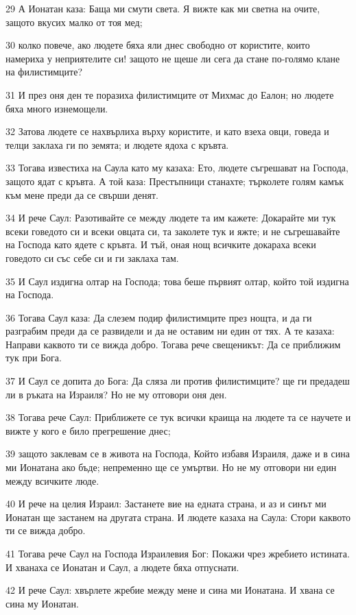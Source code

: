 \par 29 А Ионатан каза: Баща ми смути света. Я вижте как ми светна на очите, защото вкусих малко от тоя мед;
\par 30 колко повече, ако людете бяха яли днес свободно от користите, които намериха у неприятелите си! защото не щеше ли сега да стане по-голямо клане на филистимците?
\par 31 И през оня ден те поразиха филистимците от Михмас до Еалон; но людете бяха много изнемощели.
\par 32 Затова людете се нахвърлиха върху користите, и като взеха овци, говеда и телци заклаха ги по земята; и людете ядоха с кръвта.
\par 33 Тогава известиха на Саула като му казаха: Ето, людете съгрешават на Господа, защото ядат с кръвта. А той каза: Престъпници станахте; търколете голям камък към мене преди да се свърши денят.
\par 34 И рече Саул: Разотивайте се между людете та им кажете: Докарайте ми тук всеки говедото си и всеки овцата си, та заколете тук и яжте; и не съгрешавайте на Господа като ядете с кръвта. И тъй, оная нощ всичките докараха всеки говедото си със себе си и ги заклаха там.
\par 35 И Саул издигна олтар на Господа; това беше първият олтар, който той издигна на Господа.
\par 36 Тогава Саул каза: Да слезем подир филистимците през нощта, и да ги разграбим преди да се развидели и да не оставим ни един от тях. А те казаха: Направи каквото ти се вижда добро. Тогава рече свещеникът: Да се приближим тук при Бога.
\par 37 И Саул се допита до Бога: Да сляза ли против филистимците? ще ги предадеш ли в ръката на Израиля? Но не му отговори оня ден.
\par 38 Тогава рече Саул: Приближете се тук всички краища на людете та се научете и вижте у кого е било прегрешение днес;
\par 39 защото заклевам се в живота на Господа, Който избавя Израиля, даже и в сина ми Ионатана ако бъде; непременно ще се умъртви. Но не му отговори ни един между всичките люде.
\par 40 И рече на целия Израил: Застанете вие на едната страна, и аз и синът ми Ионатан ще застанем на другата страна. И людете казаха на Саула: Стори каквото ти се вижда добро.
\par 41 Тогава рече Саул на Господа Израилевия Бог: Покажи чрез жребието истината. И хванаха се Ионатан и Саул, а людете бяха отпуснати.
\par 42 И рече Саул: хвърлете жребие между мене и сина ми Ионатана. И хвана се сина му Ионатан.
